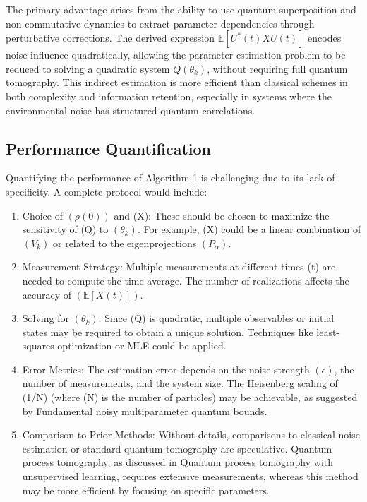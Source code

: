 \documentclass[journal,twocolumn]{IEEEtran}
\begin{document}
The primary advantage arises from the ability to use quantum superposition and non-commutative dynamics to extract parameter dependencies through perturbative corrections. The derived expression \( \mathbb{E}[U^*(t) X U(t)] \) encodes noise influence quadratically, allowing the parameter estimation problem to be reduced to solving a quadratic system \( Q(\theta_k) \), without requiring full quantum tomography. This indirect estimation is more efficient than classical schemes in both complexity and information retention, especially in systems where the environmental noise has structured quantum correlations.

 \subsection{ Performance Quantification}
 
 Quantifying the performance of Algorithm 1 is challenging due to its lack of specificity. A complete protocol would include:
 \begin{enumerate}   
 \item Choice of $(\rho(0))$ and (X): These should be chosen to maximize the sensitivity of (Q) to $(\theta_k)$. For example, (X) could be a linear combination of $(V_k)$ or related to the eigenprojections $(P_\alpha)$.
 
 \item Measurement Strategy: Multiple measurements at different times (t) are needed to compute the time average. The number of realizations affects the accuracy of $(\mathbb{E}[X(t)])$.
 
 \item Solving for $(\theta_k)$: Since (Q) is quadratic, multiple observables or initial states may be required to obtain a unique solution. Techniques like least-squares optimization or MLE could be applied.
 
 \item Error Metrics: The estimation error depends on the noise strength $(\epsilon)$, the number of measurements, and the system size. The Heisenberg scaling of (1/N) (where (N) is the number of particles) may be achievable, as suggested by Fundamental noisy multiparameter quantum bounds.
 
 \item Comparison to Prior Methods: Without details, comparisons to classical noise estimation or standard quantum tomography are speculative. Quantum process tomography, as discussed in Quantum process tomography with unsupervised learning, requires extensive measurements, whereas this method may be more efficient by focusing on specific parameters.
 \end{enumerate} 
\end{document}
